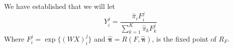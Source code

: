 We have established that we will let \[Y_i^j = \dfrac{\hat{\pi}_i F_i^j}{\sum_{k=1}^{K}
 \hat{\pi}_k F_k^j}\]
Where $F_i^j = \exp\{(WX)_i^j\}$ and $\hat{\bm\pi}=R(F,\hat{\bm \pi})$, is the fixed point
of $R_F$.